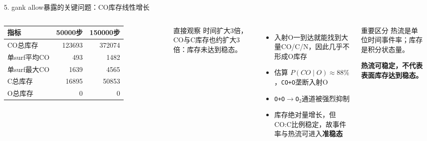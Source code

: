 \documentclass[aspectratio=169,11pt]{ctexbeamer}
\begin{document}
\begin{frame}{5. gank allow暴露的关键问题：CO库存线性增长}
  \begin{columns}[T,totalwidth=\textwidth]
    \begin{tabular}{lrr}
      \toprule
      指标 & 50000步 & 150000步 \\
      \midrule
      CO总库存 & 123693 & 372074 \\
      单surf平均CO & 493 & 1482 \\
      单surf最大CO & 1639 & 4565 \\
      C总库存 & 16895 & 50853 \\
      O总库存 & 0 & 0 \\
      \bottomrule
    \end{tabular}
    \vspace{0.45cm}
    \begin{alertblock}{直接观察}
      时间扩大3倍，CO与C库存也约扩大3倍：库存未达到稳态。
    \end{alertblock}
    \begin{itemize}
      \item 入射O一到达就能找到大量CO/C/N，因此几乎不形成O库存
      \item 估算 $P(CO\mid O)\approx88\%$，\texttt{CO+O}垄断入射O
      \item \texttt{O+O$\rightarrow$O$_2$}通道被强烈抑制
      \item 库存绝对量增长，但CO:C比例稳定，故事件率与热流可进入\textbf{准稳态}
    \end{itemize}
    \begin{block}{重要区分}
      热流是单位时间事件率；库存是积分状态量。\par
      \textbf{热流可稳定，不代表表面库存达到稳态。}
    \end{block}
  \end{columns}
\end{frame}
\end{document}

